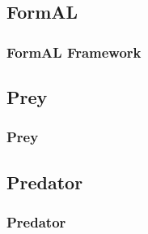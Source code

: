 \subsection{FormAL}

\frame
{
	\frametitle{FormAL Framework}
}

\subsection{Prey}

\frame
{
	\frametitle{Prey}
}

\subsection{Predator}

\frame
{
	\frametitle{Predator}
}